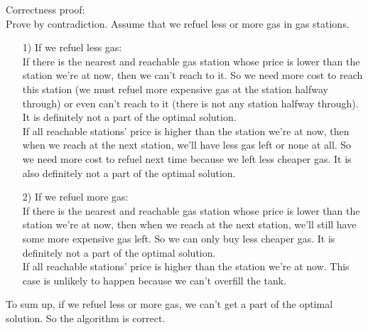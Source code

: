 \documentclass{oxmathproblems}
\begin{document}
\begin{questions}
    Correctness proof:\\
    Prove by contradiction. Assume that we refuel less or more gas in gas stations.
    \begin{itemize}
      \item [1)] If we refuel less gas:\\
      If there is the nearest and reachable gas station whose price is lower than the station we're at now, then we can't reach to it.
      So we need more cost to reach this station (we must refuel more expensive gas at the station halfway through) or even can't reach to it (there is not any station halfway through).
      It is definitely not a part of the optimal solution.\\
      If all reachable stations' price is higher than the station we're at now, then when we reach at the next station, we'll have less gas left or none at all.
      So we need more cost to refuel next time because we left less cheaper gas.
      It is also definitely not a part of the optimal solution.
      \item [2)] If we refuel more gas:\\
      If there is the nearest and reachable gas station whose price is lower than the station we're at now, then when we reach at the next station, we'll still have some more expensive gas left.
      So we can only buy less cheaper gas.
      It is definitely not a part of the optimal solution.\\
      If all reachable stations' price is higher than the station we're at now. This case is unlikely to happen because we can't overfill the tank.
    \end{itemize}
    To sum up, if we refuel less or more gas, we can't get a part of the optimal solution. So the algorithm is correct.


\end{questions}
\end{document}
